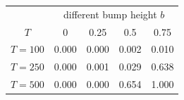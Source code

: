 % 
\begin{tabular}{ccccc}
  \hline
  & \multicolumn{4}{c}{different bump height $b$} \\
 $T$ & 0 & 0.25 & 0.5 & 0.75 \\
 \hline
$T = 100$ & 0.000 & 0.000 & 0.002 & 0.010 \\ 
  $T = 250$ & 0.000 & 0.001 & 0.029 & 0.638 \\ 
  $T = 500$ & 0.000 & 0.000 & 0.654 & 1.000 \\ 
   \hline
\end{tabular}

